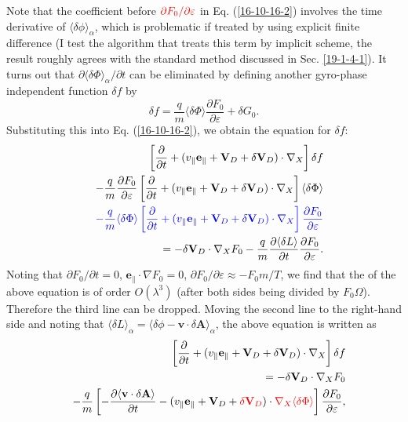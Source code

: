 \documentclass{llncs}
\newcommand{\tmcolor}[2]{{\color{#1}{#2}}}
\begin{document}
Note that the coefficient before $\tmcolor{red}{\partial F_0 / \partial
\varepsilon}$ in Eq. (\ref{16-10-16-2}) involves the time derivative of
$\langle \delta \phi \rangle_{\alpha}$, which is problematic if treated by
using explicit finite difference (I test the algorithm that treats this term
by implicit scheme, the result roughly agrees with the standard method
discussed in Sec. \ref{19-1-4-1}). It turns out that $\partial \langle \delta
\Phi \rangle_{\alpha} / \partial t$ can be eliminated by defining another
gyro-phase independent function $\delta f$ by
\begin{equation}
  \label{16-10-16-1} \delta f = \frac{q}{m} \langle \delta \Phi \rangle
  \frac{\partial F_0}{\partial \varepsilon} + \delta G_0 .
\end{equation}
Substituting this into Eq. (\ref{16-10-16-2}), we obtain the equation for
$\delta f$:
\begin{eqnarray}
  &  & \left[ \frac{\partial}{\partial t} + (v_{\parallel}
  \mathbf{e}_{\parallel} +\mathbf{V}_D + \delta \mathbf{V}_D) \cdot \nabla_X
  \right] \delta f \nonumber\\
  &  & - \frac{q}{m}  \frac{\partial F_0}{\partial \varepsilon} \left[
  \frac{\partial}{\partial t} + (v_{\parallel} \mathbf{e}_{\parallel}
  +\mathbf{V}_D + \delta \mathbf{V}_D) \cdot \nabla_X \right] \langle \delta
  \Phi \rangle \nonumber\\
  &  & \tmcolor{blue}{- \frac{q}{m}  \langle \delta \Phi \rangle \left[
  \frac{\partial}{\partial t} + (v_{\parallel} \mathbf{e}_{\parallel}
  +\mathbf{V}_D + \delta \mathbf{V}_D) \cdot \nabla_X \right] \frac{\partial
  F_0}{\partial \varepsilon}} \nonumber\\
  &  & = - \delta \mathbf{V}_D \cdot \nabla_X F_0 - \frac{q}{m} 
  \frac{\partial \langle \delta L \rangle}{\partial t}  \frac{\partial
  F_0}{\partial \varepsilon} . 
\end{eqnarray}
Noting that $\partial F_0 / \partial t = 0$, $\mathbf{e}_{\parallel} \cdot
\nabla F_0 = 0$, $\partial F_0 / \partial \varepsilon \approx - F_0 m / T$, we
find that the \tmcolor{blue}{third line} of the above equation is of order $O
(\lambda^3)$ (after both sides being divided by $F_0 \Omega$). Therefore the
third line can be dropped. Moving the second line to the right-hand side and
noting that $\langle \delta L \rangle_{\alpha} = \langle \delta \phi
-\mathbf{v} \cdot \delta \mathbf{A} \rangle_{\alpha}$, the above equation is
written as
\begin{eqnarray}
  &  & \left[ \frac{\partial}{\partial t} + (v_{\parallel}
  \mathbf{e}_{\parallel} +\mathbf{V}_D + \delta \mathbf{V}_D) \cdot \nabla_X
  \right] \delta f \nonumber\\
  &  & = - \delta \mathbf{V}_D \cdot \nabla_X F_0 \nonumber\\
  &  & - \frac{q}{m} \left[ - \frac{\partial \langle \mathbf{v} \cdot \delta
  \mathbf{A} \rangle}{\partial t} - (v_{\parallel} \mathbf{e}_{\parallel}
  +\mathbf{V}_D + \tmcolor{red}{\delta \mathbf{V}_D}) \cdot
  \tmcolor{red}{\nabla_X \langle \delta \Phi \rangle} \right] \frac{\partial
  F_0}{\partial \varepsilon},  \label{17-5-13-p2}
\end{eqnarray}
\end{document}

